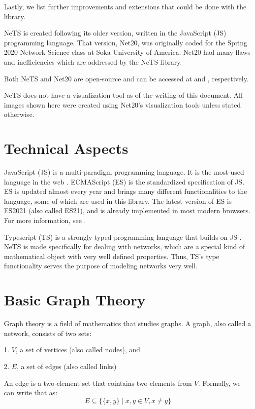 Lastly, we list further improvements and extensions that could be done with the library.

NeTS is created following its older version, written in the JavaScript (JS) programming language.
That version, Net20, was originally coded for the Spring 2020 Network Science class
at Soka University of America.
Net20 had many flaws and inefficiencies which are addressed by the NeTS library.

Both NeTS and Net20 are open-source and can be accessed
at \cite{morais_rodigunets_2022} and \cite{morais_rodigunetwork2020_2020}, respectively.

NeTS does not have a visualization tool as of the writing of this document.
All images shown here were created using Net20's visualization tools unless stated otherwise.

\section{Technical Aspects}

JavaScript (JS) is a multi-paradigm programming language.
It is the most-used language in the web \cite{noauthor_javascript_nodate}.
ECMAScript (ES) is the standardized specification of JS.
ES is updated almost every year and brings many different functionalities to the language, some of which are used in this library.
The latest version of ES is ES2021 (also called ES21),
and is already implemented in most modern browsers.
For more information, see \cite{international_ecmascript_nodate}.

Typescript (TS) is a strongly-typed programming language that builds on JS \cite{noauthor_handbook_nodate}.
NeTS is made specifically for dealing with networks,
which are a special kind of mathematical object with very well defined properties.
Thus, TS's type functionality serves the purpose of modeling networks very well.

\section{Basic Graph Theory}

Graph theory is a field of mathematics that studies graphs.
A graph, also called a network, consists of two sets:

1. $V$, a set of vertices (also called nodes), and

2. $E$, a set of edges (also called links)

An edge is a two-element set that cointains two elements from $V$.
Formally, we can write that as:
$$E\subseteq \{\{x,y\}\mid x,y\in V, x\ne y\}$$

